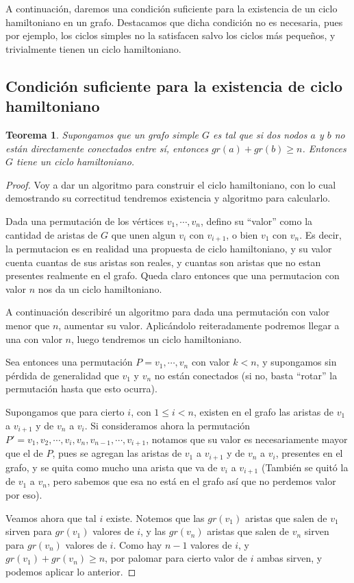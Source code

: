 \documentclass{article}
\newtheorem{teorema}{{\sc Teorema}}
\begin{document}
A continuación, daremos una condición suficiente para la existencia de un ciclo hamiltoniano en un grafo. Destacamos que dicha condición no es
necesaria, pues por ejemplo, los ciclos simples no la satisfacen salvo los ciclos más pequeños, y trivialmente tienen un ciclo hamiltoniano.

\subsection{Condición suficiente para la existencia de ciclo hamiltoniano}

\begin{teorema}
Supongamos que un grafo simple $G$ es tal que si dos nodos $a$ y $b$ no están directamente conectados entre sí, entonces $gr(a) + gr(b) \geq n$.
Entonces $G$ tiene un ciclo hamiltoniano.
\end{teorema}
\begin{proof}
Voy a dar un algoritmo para construir el ciclo hamiltoniano, con lo cual demostrando su correctitud tendremos existencia y algoritmo para calcularlo.

Dada una permutación de los vértices $v_1, \cdots , v_n$, defino su ``valor'' como la cantidad de aristas de $G$ que unen algun $v_i$ con $v_{i+1}$,
o bien $v_1$ con $v_n$. Es decir, la permutacion es en realidad una propuesta de ciclo hamiltoniano, y su valor cuenta cuantas de sus aristas son
reales, y cuantas son aristas que no estan presentes realmente en el grafo. Queda claro entonces que una permutacion con valor $n$ nos da un
ciclo hamiltoniano.

A continuación describiré un algoritmo para dada una permutación con valor menor que $n$, aumentar su valor. Aplicándolo reiteradamente podremos
llegar a una con valor $n$, luego tendremos un ciclo hamiltoniano.

Sea entonces una permutación  $P = v_1, \cdots , v_n$ con valor $k < n$, y supongamos sin pérdida de generalidad que $v_1$ y $v_n$ no están conectados
(si no, basta ``rotar'' la permutación hasta que esto ocurra).

Supongamos que para cierto $i$, con $1 \leq i < n$, existen en el grafo las aristas de $v_1$ a $v_{i+1}$ y de $v_n$ a $v_i$.
Si consideramos ahora la permutación $P' = v_1,v_2, \cdots, v_i, v_n, v_{n-1}, \cdots, v_{i+1}$, notamos que su valor es necesariamente
mayor que el de $P$, pues se agregan las aristas de $v_1$ a $v_{i+1}$ y de $v_n$ a $v_i$, presentes en el grafo, y se quita como mucho
una arista que va de $v_i$ a $v_{i+1}$ (También se quitó la de $v_1$ a $v_n$, pero sabemos que esa no está en el grafo así que no perdemos
valor por eso).

Veamos ahora que tal $i$ existe. Notemos que las $gr(v_1)$ aristas que salen de $v_1$ sirven para
$gr(v_1)$ valores de $i$, y las $gr(v_n)$ aristas que salen de $v_n$ sirven para $gr(v_n)$ valores de $i$.
Como hay $n-1$ valores de $i$, y $gr(v_1) + gr(v_n) \geq n$, por palomar para cierto valor de $i$ ambas sirven, y podemos aplicar lo anterior.
\end{proof}
\end{document}
